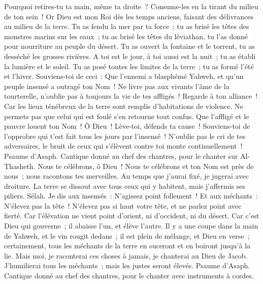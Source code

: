 \begin{multicols}{2}
Pourquoi retires-tu ta main, même ta droite~? Consume-les en la tirant du milieu de ton sein~!
Or Dieu est mon Roi dès les temps anciens, faisant des délivrances au milieu de la terre.
Tu as fendu la mer par ta force~; tu as brisé les têtes des monstres marins sur les eaux~;
tu as brisé les têtes du léviathan, tu l'as donné pour nourriture au peuple du désert.
Tu as ouvert la fontaine et le torrent, tu as desséché les grosses rivières.
A toi est le jour, à toi aussi est la nuit~; tu as établi la lumière et le soleil.
Tu as posé toutes les limites de la terre~; tu as formé l'été et l'hiver.
Souviens-toi de ceci~: Que l'ennemi a blasphémé Yahweh, et qu'un peuple insensé a outragé ton Nom~!
Ne livre pas aux vivants l'âme de la tourterelle, n'oublie pas à toujours la vie de tes affligés~!
Regarde à ton alliance~! Car les lieux ténébreux de la terre sont remplis d'habitations de violence.
Ne permets pas que celui qui est foulé s'en retourne tout confus. Que l'affligé et le pauvre louent ton Nom~!
Ô Dieu~! Lève-toi, défends ta cause~! Souviens-toi de l'opprobre qui t'est fait tous les jours par l'insensé~!
N'oublie pas le cri de tes adversaires, le bruit de ceux qui s'élèvent contre toi monte continuellement~!
\VerseOne{}Psaume d'Asaph. Cantique donné au chef des chantres, pour le chanter sur Al-Thasheth.
Nous te célébrons, ô Dieu~! Nous te célébrons et ton Nom est près de nous~; nous racontons tes merveilles.
Au temps que j'aurai fixé, je jugerai avec droiture.
La terre se dissout avec tous ceux qui y habitent, mais j'affermis ses piliers. Sélah.
Je dis aux insensés~: N'agissez point follement~! Et aux méchants~: N'élevez pas la tête~!
N'élevez pas si haut votre tête, et ne parlez point avec fierté.
Car l'élévation ne vient point d'orient, ni d'occident, ni du désert.
Car c'est Dieu qui gouverne~; il abaisse l'un, et élève l'autre.
Il y a une coupe dans la main de Yahweh, et le vin rougit dedans~; il est plein de mélange, et Dieu en verse~; certainement, tous les méchants de la terre en suceront et en boiront jusqu'à la lie.
Mais moi, je raconterai ces choses à jamais, je chanterai au Dieu de Jacob.
J'humilierai tous les méchants~; mais les justes seront élevés.
\VerseOne{}Psaume d'Asaph. Cantique donné au chef des chantres, pour le chanter avec instruments à cordes.

\end{multicols}
